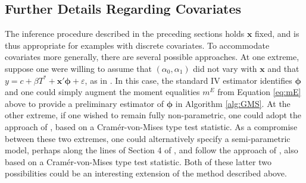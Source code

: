 \subsection{Further Details Regarding Covariates}
\label{sec:covariates}

The inference procedure described in the preceding sections holds $\mathbf{x}$ fixed, and is thus appropriate for examples with discrete covariates.
To accommodate covariates more generally, there are several possible approaches.
At one extreme, suppose one were willing to assume that $(\alpha_0, \alpha_1)$ did not vary with $\mathbf{x}$ and that $y = c + \beta T^* + \mathbf{x}'\boldsymbol{\phi} + \varepsilon$, as in \cite{FL}.
In this case, the standard IV estimator identifies $\boldsymbol{\phi}$ and one could simply augment the moment equalities $m^E$ from Equation \ref{eq:mE} above to provide a preliminary estimator of $\boldsymbol{\phi}$ in Algorithm \ref{alg:GMS}.
At the other extreme, if one wished to remain fully non-parametric, one could adopt the approach of \cite{andrews2014nonparametric}, based on a Cram\'{e}r-von-Mises type test statistic.
As a compromise between these two extremes, one could alternatively specify a semi-parametric model, perhaps along the lines of Section 4 of \cite{Lewbel}, and follow the approach of \cite{andrews2013inference}, also based on a Cram\'{e}r-von-Mises type test statistic.
Both of these latter two possibilities could be an interesting extension of the method described above.
